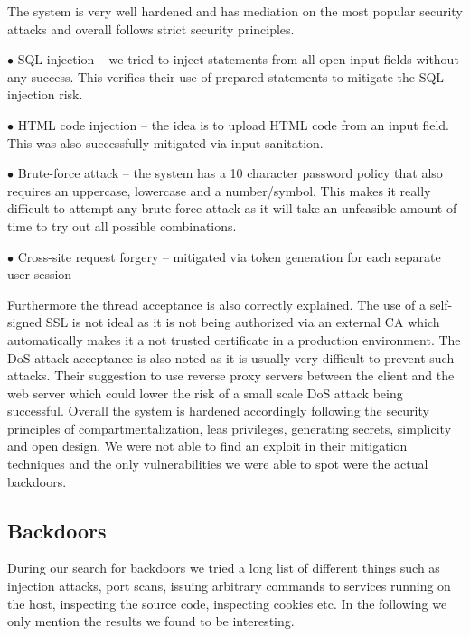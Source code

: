 \documentclass{article}
\begin{document}
The system is very well hardened and has mediation on the most popular security attacks and overall follows strict security principles.

\begin{description}
\item $\bullet$ SQL injection – we tried to inject statements from all open input fields without any success. This verifies their use of prepared statements to mitigate the SQL injection risk.
\item $\bullet$ HTML code injection – the idea is to upload HTML code from an input field. This was also successfully mitigated via input sanitation.
\item $\bullet$ Brute-force attack – the system has a 10 character password policy that also requires an uppercase, lowercase and a number/symbol. This makes it really difficult to attempt any brute force attack as it will take an unfeasible amount of time to try out all possible combinations.
\item $\bullet$ Cross-site request forgery – mitigated via token generation for each separate user session
\end{description}

Furthermore the thread acceptance is also correctly explained. The use of a self-signed SSL is not ideal as it is not being authorized via an external CA which automatically makes it a not trusted certificate in a production environment. The DoS attack acceptance is also noted as it is usually very difficult to prevent such attacks. Their suggestion to use reverse proxy servers between the client and the web server which could lower the risk of a small scale DoS attack being successful. 
\newline
Overall the system is hardened accordingly following the security principles of compartmentalization, leas privileges, generating secrets, simplicity and open design. We were not able to find an exploit in their mitigation techniques and the only vulnerabilities we were able to spot were the actual backdoors.

\subsection{Backdoors}
During our search for backdoors we tried a long list of different things such as injection attacks, port scans, 
issuing arbitrary commands to services running on the host, inspecting the source code, inspecting cookies etc. 
In the following we only mention the results we found to be interesting.
\end{document}
